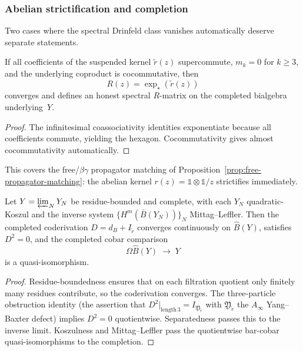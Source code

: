 \subsubsection{Abelian strictification and completion}

Two cases where the spectral Drinfeld class vanishes
automatically deserve separate statements.

\begin{theorem}
\label{thm:spectral-abelian-strictification}
If all coefficients of the suspended kernel
$\widetilde{r}(z)$ supercommute, $m_k = 0$ for $k \ge 3$,
and the underlying coproduct is cocommutative, then
\[
 R(z) = \exp_\star(\widetilde{r}(z))
\]
converges and defines an honest spectral $R$-matrix on the
completed bialgebra underlying~$Y$.
\end{theorem}

\begin{proof}
The infinitesimal coassociativity identities exponentiate
because all coefficients commute, yielding the hexagon.
Cocommutativity gives almost cocommutativity automatically.
\end{proof}

This covers the free/$\beta\gamma$ propagator matching of
Proposition~\ref{prop:free-propagator-matching}: the abelian
kernel $r(z) = \mathbb{1} \otimes \mathbb{1}/z$ strictifies
immediately.

\begin{theorem}
\label{thm:spectral-residue-bounded-completion}
Let $Y = \varprojlim_N Y_N$ be residue-bounded and complete,
with each $Y_N$ quadratic-Koszul and the inverse system
$\{H^m(\bar B(Y_N))\}_N$ Mittag--Leffler. Then the completed
coderivation $D = d_B + I_{\widetilde{r}}$ converges
continuously on $\widehat{B}(Y)$, satisfies $D^2 = 0$, and
the completed cobar comparison
\[
 \Omega\widehat{B}(Y) \;\longrightarrow\; Y
\]
is a quasi-isomorphism.
\end{theorem}

\begin{proof}
Residue-boundedness ensures that on each filtration quotient only
finitely many residues contribute, so the coderivation converges.
The three-particle obstruction identity (the assertion that
$D^2|_{\text{length}\,3} = I_{\mathfrak{Y}_{\widetilde{r}}}$
with $\mathfrak{Y}_{\widetilde{r}}$ the $A_\infty$ Yang--Baxter
defect) implies $D^2 = 0$ quotientwise. Separatedness passes
this to the inverse limit. Koszulness and Mittag--Leffler
pass the quotientwise bar-cobar quasi-isomorphisms to the
completion.
\end{proof}

